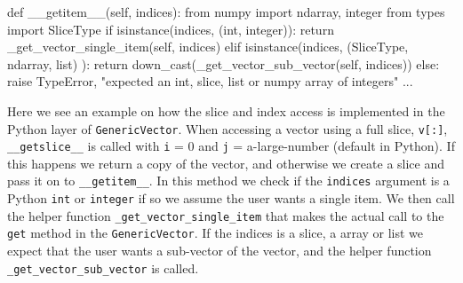 \begin{code}
\begin{code}
    def __getitem__(self, indices):
        from numpy import ndarray, integer
        from types import SliceType
        if isinstance(indices, (int, integer)):
            return _get_vector_single_item(self, indices)
        elif isinstance(indices, (SliceType, ndarray, list) ):
            return down_cast(_get_vector_sub_vector(self, indices))
        else:
            raise TypeError, "expected an int, slice, list or numpy array of integers"
  ...
\end{code}
Here we see an example on how the slice and index access is implemented in the Python layer of \texttt{GenericVector}. When accessing a vector using a full slice, \texttt{v[:]}, \texttt{\_\_getslice\_\_} is called with \texttt{i} = 0 and \texttt{j} = a-large-number (default in Python).  If this happens we return a copy of the vector, and otherwise we create a slice and pass it on to \texttt{\_\_getitem\_\_}. In this method we check if the \texttt{indices} argument is a Python \texttt{int} or \numpy \texttt{integer} if so we assume the user wants a single item. We then call the helper function \texttt{\_get\_vector}\texttt{\_single\_item} that makes the actual call to the \texttt{get} method in the \texttt{GenericVector}. If the indices is a slice, a \numpy array or list we expect that the user wants a sub-vector of the vector, and the helper function \texttt{\_get\_vector}\texttt{\_sub\_vector} is called.\par


\end{code}
